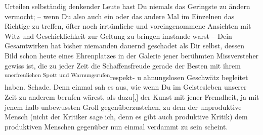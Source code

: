                Urteilen selbständig denkender Leute hast Du niemals das Geringste zu ändern
               vermocht; – wenn Du also auch ein oder das andere Mal im Einzelnen das Richtige zu
               treffen, öfter noch irrtümliche und voreingenommene Ansichten mit Witz und
               Geschicklichkeit zur Geltung zu bringen imstande warst – Dein Gesamtwirken hat bisher
               niemanden dauernd geschadet als Dir selbst, dessen Bild schon heute eines
               Ehrenplatzes in der Galerie jener berühmten Missversteher gewiss ist, die zu jeder
               Zeit die Schaffensfreude gerade der Besten mit ihrem \substVorne{}\textsuperscript{unerfreulichen Spott und Warnungsrufen}{\allowbreak}\substDazwischen{}respekt- u ahnungslosen Geschwätz\substHinten{} begleitet haben. Schade. Denn einmal sah es aus, wie wenn Du im Geistesleben
               unserer Zeit zu anderem berufen wärest, als
                  dazu{[},{]} der Kunst mit jener
               Fremdheit, ja mit jenem halb unbewussten Groll gegenüberzustehen, zu dem der
               unproduktive Mensch (nicht der Kritiker sage ich, denn es gibt auch produktive
               Kritik) dem produktiven Menschen gegenüber nun einmal verdammt zu {\pb}sein scheint.\pend
           
